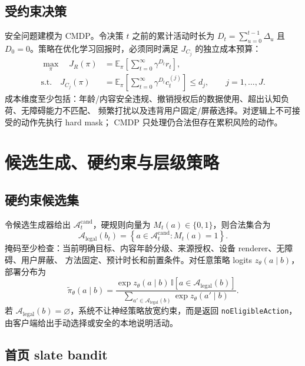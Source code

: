 \documentclass[11pt,a4paper,fontset=none]{ctexart}
\newcommand{\E}{\mathbb{E}}
\newcommand{\1}{\mathbb{I}}
\newcommand{\Alegal}{\mathcal{A}_{\mathrm{legal}}}
\begin{document}
\subsection{受约束决策}

安全问题建模为 CMDP。令决策 $t$ 之前的累计活动时长为
$D_t=\sum_{u=0}^{t-1}\Delta_u$ 且 $D_0=0$。策略在优化学习回报时，必须同时满足
$J_{C_j}$ 的独立成本预算：
\begin{align}
  \max_{\pi}\quad
  J_R(\pi)&=\E_\pi\!\left[\sum_{t=0}^{\infty}\gamma^{D_t} r_t\right],
  \label{eq:cmdp-objective}\\
  \text{s.t.}\quad
  J_{C_j}(\pi)&=\E_\pi\!\left[\sum_{t=0}^{\infty}\gamma^{D_t} c_t^{(j)}\right]
  \le d_j,\qquad j=1,\ldots,J.
  \label{eq:cmdp-constraint}
\end{align}
成本维度至少包括：年龄/内容安全违规、撤销授权后的数据使用、超出认知负荷、无障碍能力不匹配、
频繁打扰以及违背用户固定/屏蔽选择。对逻辑上不可接受的动作先执行 hard mask；
CMDP 只处理仍合法但存在累积风险的动作。

\section{候选生成、硬约束与层级策略}

\subsection{硬约束候选集}

令候选生成器给出 $\mathcal{A}_t^{\mathrm{cand}}$，硬规则向量为
$M_t(a)\in\{0,1\}$，则合法集合为
\begin{equation}
  \Alegal(b_t)=\left\{a\in\mathcal{A}_t^{\mathrm{cand}}:
  M_t(a)=1\right\}.
  \label{eq:legal-set}
\end{equation}
掩码至少检查：当前明确目标、内容年龄分级、来源授权、设备 renderer、无障碍、用户屏蔽、
方法固定、预计时长和前置条件。对任意策略 logits $z_\theta(a\mid b)$，部署分布为
\begin{equation}
  \widetilde\pi_\theta(a\mid b)=
  \frac{\exp z_\theta(a\mid b)\,\1[a\in\Alegal(b)]}
  {\sum_{a'\in\Alegal(b)}\exp z_\theta(a'\mid b)}.
  \label{eq:masked-policy}
\end{equation}
若 $\Alegal(b)=\varnothing$，系统不让神经策略放宽约束，而是返回
\texttt{noEligibleAction}，由客户端给出手动选择或安全的本地说明活动。

\subsection{首页 slate bandit}
\end{document}

